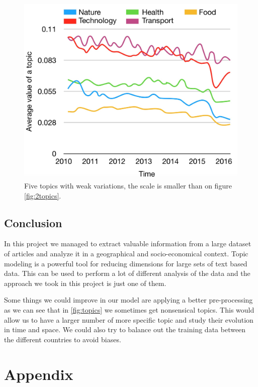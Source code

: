 \documentclass[11pt]{article}
\begin{document}
\begin{figure}[htbp!]
    \centering
    \includegraphics[width=\linewidth]{images/stagningtopics.jpg}
    \caption{Five topics with weak variations, the scale is smaller than on figure \ref{fig:2topics}.}
    \label{fig:5topics}
\end{figure}


\onecolumn

\begin{multicols}{2}

\section{Conclusion}

In this project we managed to extract valuable information from a large dataset of articles and analyze it in a geographical and socio-economical context. Topic modeling is a powerful tool for reducing dimensions for large sets of text based data. This can be used to perform a lot of different analysis of the data and the approach we took in this project is just one of them.

Some things we could improve in our model are applying a better pre-processing as we can see that in \ref{fig:topics} we sometimes get nonsensical topics. This would allow us to have a larger number of more specific topic and study their evolution in time and space. We could also try to balance out the training data between the different countries to avoid biases.\vfill

\nocite{*}
\printbibliography[]

\end{multicols}

\bigskip
\section*{Appendix}

\end{document}
